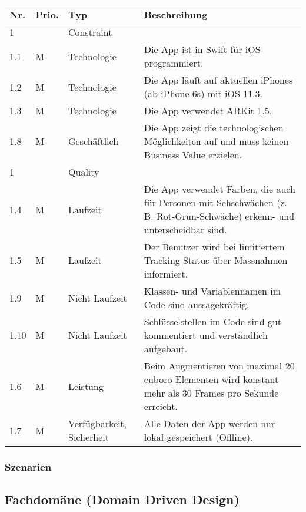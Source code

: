 	\begin{longtable}{l l l p{9cm}}
		\hline
		\textbf{Nr.} & \textbf{Prio.} & \textbf{Typ} & \textbf{Beschreibung} \\
		\hline
		1 & & Constraint & \\
		\hline
		1.1 & M & Technologie & Die App ist in Swift für iOS programmiert. \\
		1.2 & M & Technologie & Die App läuft auf aktuellen iPhones (ab iPhone 6s) mit iOS 11.3. \\
		1.3 & M & Technologie & Die App verwendet ARKit 1.5. \\
		1.8 & M & Geschäftlich & Die App zeigt die technologischen Möglichkeiten auf und muss keinen Business Value erzielen. \\
		\hline
		1 & & Quality & \\
		\hline
		1.4 & M & Laufzeit & Die App verwendet Farben, die auch für Personen mit Sehschwächen (z. B. Rot-Grün-Schwäche) erkenn- und unterscheidbar sind. \\ 
		1.5 & M & Laufzeit & Der Benutzer wird bei limitiertem Tracking Status über Massnahmen informiert. \\
		1.9 & M & Nicht Laufzeit & Klassen- und Variablennamen im Code sind aussagekräftig. \\
		1.10 & M & Nicht Laufzeit & Schlüsselstellen im Code sind gut kommentiert und verständlich aufgebaut. \\
		1.6 & M & Leistung & Beim Augmentieren von maximal 20 cuboro Elementen wird konstant mehr als 30 Frames pro Sekunde erreicht. \\
		1.7 & M & Verfügbarkeit, Sicherheit & Alle Daten der App werden nur lokal gespeichert (Offline). \\
		\hline
	\end{longtable}

\subsubsection{Szenarien}

\subsection{Fachdomäne (Domain Driven Design)}

